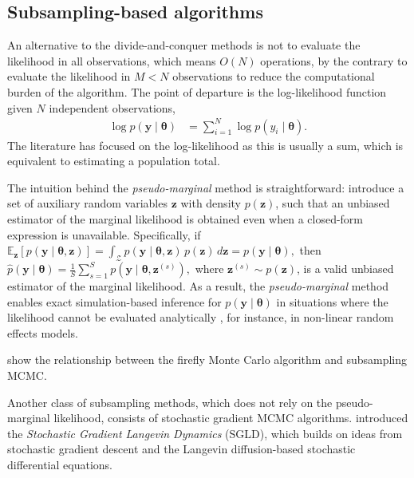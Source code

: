 \subsection{Subsampling-based algorithms}

An alternative to the divide-and-conquer methods is not to evaluate the likelihood in all observations, which means $O(N)$ operations, by the contrary to evaluate the likelihood in $M<N$ observations to reduce the computational burden of the algorithm. The point of departure is the log-likelihood function given $N$ independent observations,
\begin{align*}
	\log p(\mathbf{y}\mid \boldsymbol{\theta})&=\sum_{i=1}^N \log p(y_i\mid \boldsymbol{\theta}).
\end{align*} 
The literature has focused on the log-likelihood as this is usually a sum, which is equivalent to estimating a population total. 

The intuition behind the \textit{pseudo-marginal} method is straightforward: introduce a set of auxiliary random variables \( \mathbf{z} \) with density \( p(\mathbf{z}) \), such that an unbiased estimator of the marginal likelihood is obtained even when a closed-form expression is unavailable. Specifically, if \(\mathbb{E}_{\mathbf{z}}[p(\mathbf{y} \mid \boldsymbol{\theta}, \mathbf{z})] = \int_{\mathcal{Z}} p(\mathbf{y} \mid \boldsymbol{\theta}, \mathbf{z}) \, p(\mathbf{z}) \, d\mathbf{z} = p(\mathbf{y} \mid \boldsymbol{\theta}),
\)
then
\(
\hat{p}(\mathbf{y} \mid \boldsymbol{\theta}) = \frac{1}{S} \sum_{s=1}^S p(\mathbf{y} \mid \boldsymbol{\theta}, \mathbf{z}^{(s)}),
\)
where \( \mathbf{z}^{(s)} \sim p(\mathbf{z}) \), is a valid unbiased estimator of the marginal likelihood. As a result, the \textit{pseudo-marginal} method enables exact simulation-based inference for \( p(\mathbf{y} \mid \boldsymbol{\theta}) \) in situations where the likelihood cannot be evaluated analytically \cite{andrieu2009pseudoefficient}, for instance, in non-linear random effects models.

\cite{quiroz2018subsampling,quiroz2019speeding} \cite{bardenet2017markov} show the relationship between the firefly Monte Carlo algorithm \cite{Maclaurin2015} and subsampling MCMC.

Another class of subsampling methods, which does not rely on the pseudo-marginal likelihood, consists of stochastic gradient MCMC algorithms. \cite{welling2011bayesian} introduced the \textit{Stochastic Gradient Langevin Dynamics} (SGLD), which builds on ideas from stochastic gradient descent \cite{robbins1951stochastic} and the Langevin diffusion-based stochastic differential equations.


